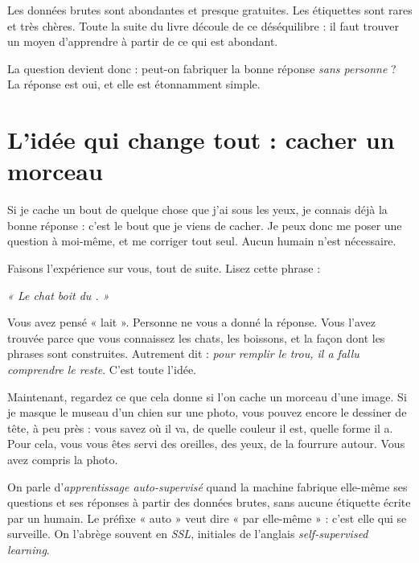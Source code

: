 \begin{aretenir}
Les données brutes sont abondantes et presque gratuites. Les étiquettes sont
rares et très chères. Toute la suite du livre découle de ce déséquilibre :
il faut trouver un moyen d'apprendre à partir de ce qui est abondant.
\end{aretenir}

La question devient donc : peut-on fabriquer la bonne réponse \emph{sans
personne} ? La réponse est oui, et elle est étonnamment simple.

\section{L'idée qui change tout : cacher un morceau}

\begin{intuition}
Si je cache un bout de quelque chose que j'ai sous les yeux, je connais déjà
la bonne réponse : c'est le bout que je viens de cacher. Je peux donc me
poser une question à moi-même, et me corriger tout seul. Aucun humain n'est
nécessaire.
\end{intuition}

Faisons l'expérience sur vous, tout de suite. Lisez cette phrase :

\begin{center}
\itshape « Le chat boit du \underline{\hphantom{xxxxxxx}}. »
\end{center}

Vous avez pensé « lait ». Personne ne vous a donné la réponse. Vous l'avez
trouvée parce que vous connaissez les chats, les boissons, et la façon dont
les phrases sont construites. Autrement dit : \emph{pour remplir le trou, il
a fallu comprendre le reste}. C'est toute l'idée.

Maintenant, regardez ce que cela donne si l'on cache un morceau d'une image.
Si je masque le museau d'un chien sur une photo, vous pouvez encore le
dessiner de tête, à peu près : vous savez où il va, de quelle couleur il est,
quelle forme il a. Pour cela, vous vous êtes servi des oreilles, des yeux, de
la fourrure autour. Vous avez compris la photo.

\begin{definition}
On parle d'\emph{apprentissage auto-supervisé} quand la machine fabrique
elle-même ses questions et ses réponses à partir des données brutes, sans
aucune étiquette écrite par un humain. Le préfixe « auto » veut dire
« par elle-même » : c'est elle qui se surveille. On l'abrège souvent en
\emph{SSL}, initiales de l'anglais \emph{self-supervised learning}.
\end{definition}

